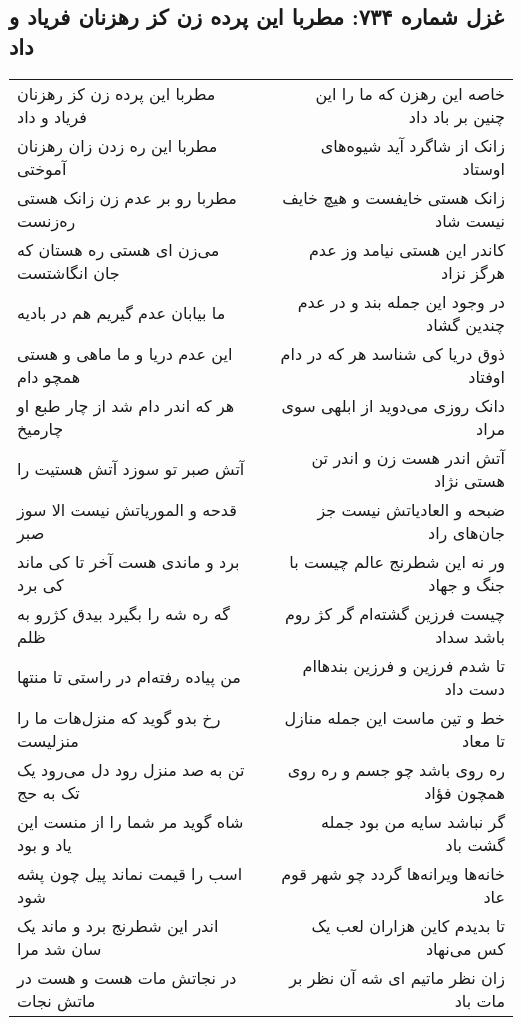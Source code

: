 \begin{center}
\section*{غزل شماره ۷۳۴: مطربا این پرده زن کز رهزنان فریاد و داد}
\label{sec:0734}
\begin{longtable}{l p{0.5cm} r}
مطربا این پرده زن کز رهزنان فریاد و داد
&&
خاصه این رهزن که ما را این چنین بر باد داد
\\
مطربا این ره زدن زان رهزنان آموختی
&&
زانک از شاگرد آید شیوه‌های اوستاد
\\
مطربا رو بر عدم زن زانک هستی ره‌زنست
&&
زانک هستی خایفست و هیچ خایف نیست شاد
\\
می‌زن ای هستی ره هستان که جان انگاشتست
&&
کاندر این هستی نیامد وز عدم هرگز نزاد
\\
ما بیابان عدم گیریم هم در بادیه
&&
در وجود این جمله بند و در عدم چندین گشاد
\\
این عدم دریا و ما ماهی و هستی همچو دام
&&
ذوق دریا کی شناسد هر که در دام اوفتاد
\\
هر که اندر دام شد از چار طبع او چارمیخ
&&
دانک روزی می‌دوید از ابلهی سوی مراد
\\
آتش صبر تو سوزد آتش هستیت را
&&
آتش اندر هست زن و اندر تن هستی نژاد
\\
قدحه و الموریاتش نیست الا سوز صبر
&&
ضبحه و العادیاتش نیست جز جان‌های راد
\\
برد و ماندی هست آخر تا کی ماند کی برد
&&
ور نه این شطرنج عالم چیست با جنگ و جهاد
\\
گه ره شه را بگیرد بیدق کژرو به ظلم
&&
چیست فرزین گشته‌ام گر کژ روم باشد سداد
\\
من پیاده رفته‌ام در راستی تا منتها
&&
تا شدم فرزین و فرزین بندهاام دست داد
\\
رخ بدو گوید که منزل‌هات ما را منزلیست
&&
خط و تین ماست این جمله منازل تا معاد
\\
تن به صد منزل رود دل می‌رود یک تک به حج
&&
ره روی باشد چو جسم و ره روی همچون فؤاد
\\
شاه گوید مر شما را از منست این یاد و بود
&&
گر نباشد سایه من بود جمله گشت باد
\\
اسب را قیمت نماند پیل چون پشه شود
&&
خانه‌ها ویرانه‌ها گردد چو شهر قوم عاد
\\
اندر این شطرنج برد و ماند یک سان شد مرا
&&
تا بدیدم کاین هزاران لعب یک کس می‌نهاد
\\
در نجاتش مات هست و هست در ماتش نجات
&&
زان نظر ماتیم ای شه آن نظر بر مات باد
\\
\end{longtable}
\end{center}
